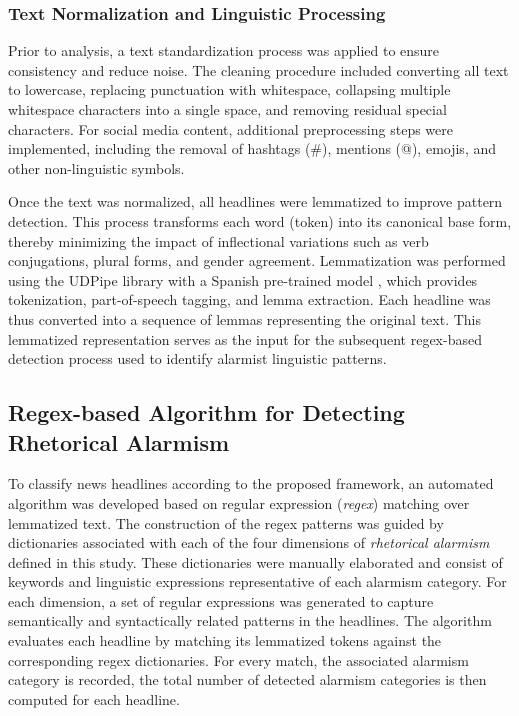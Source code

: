 \subsubsection*{Text Normalization and Linguistic Processing} 

Prior to analysis, a text standardization process was applied to ensure consistency and reduce noise. 
The cleaning procedure included converting all text to lowercase, replacing punctuation with whitespace, collapsing multiple 
whitespace characters into a single space, and removing residual special characters. For social media content, 
additional preprocessing steps were implemented, including the removal of hashtags (\#), mentions (@), emojis, and other 
non-linguistic symbols.

Once the text was normalized, all headlines were lemmatized to improve pattern detection. This process transforms each word (token) 
into its canonical base form, thereby minimizing the impact of inflectional variations such as verb conjugations, 
plural forms, and gender agreement. Lemmatization was performed using the UDPipe library \parencite{UPDipe} with a Spanish pre-trained model \parencite{2008_ancora}, 
which provides tokenization, part-of-speech tagging, and lemma extraction. Each headline was thus converted into a sequence of lemmas representing the original text. This lemmatized representation 
serves as the input for the subsequent regex-based detection process used to identify alarmist linguistic patterns.

\subsection*{Regex-based Algorithm for Detecting Rhetorical Alarmism}
To classify news headlines according to the proposed framework, an automated algorithm was developed based on regular expression (\emph{regex}) matching over lemmatized text. 
The construction of the regex patterns was guided by dictionaries associated with each of the four dimensions of \emph{rhetorical alarmism} defined in this study. 
These dictionaries were manually elaborated and consist of keywords and linguistic expressions representative of each alarmism category. 
For each dimension, a set of regular expressions was generated to capture semantically and syntactically related patterns in the headlines.
The algorithm evaluates each headline by matching its lemmatized tokens against the corresponding regex dictionaries. For every match, 
the associated alarmism category is recorded, the total number of detected alarmism categories is then computed for each headline.

